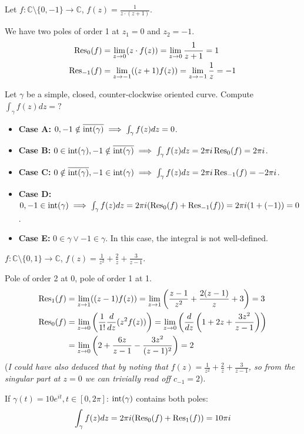 \begin{example}[Example 2]
Let $f: \mathbb{C} \setminus \{0, -1\} \longrightarrow \mathbb{C}$, $f(z) = \frac{1}{z \cdot (z+1)}$.

We have two poles of order 1 at $z_1 = 0$ and $z_2 = -1$.
\begin{align*}
\operatorname{Res}_0(f) &= \lim_{z \to 0} (z \cdot f(z)) = \lim_{z \to 0} \frac{1}{z+1} = 1 \\
\operatorname{Res}_{-1}(f) &= \lim_{z \to -1} ((z+1)f(z)) = \lim_{z \to -1} \frac{1}{z} = -1
\end{align*}

Let $\gamma$ be a simple, closed, counter-clockwise oriented curve. Compute $\int_\gamma f(z) dz = ?$
\begin{itemize}
    \item \textbf{Case A:} $0, -1 \notin \overline{\operatorname{int}(\gamma)} \implies \int_\gamma f(z) dz = 0$.
    \item \textbf{Case B:} $0 \in \operatorname{int}(\gamma), -1 \notin \overline{\operatorname{int}(\gamma)} \implies \int_\gamma f(z) dz = 2\pi i \operatorname{Res}_0(f) = 2\pi i$.
    \item \textbf{Case C:} $0 \notin \overline{\operatorname{int}(\gamma)}, -1 \in \operatorname{int}(\gamma) \implies \int_\gamma f(z) dz = 2\pi i \operatorname{Res}_{-1}(f) = -2\pi i$.
    \item \textbf{Case D:} $0, -1 \in \operatorname{int}(\gamma) \implies \int_\gamma f(z) dz = 2\pi i (\operatorname{Res}_0(f) + \operatorname{Res}_{-1}(f)) = 2\pi i (1 + (-1)) = 0$.
    \item \textbf{Case E:} $0 \in \gamma \lor -1 \in \gamma$. In this case, the integral is not well-defined.
\end{itemize}
\end{example}

\begin{example}[Example 3]
$f: \mathbb{C} \setminus \{0, 1\} \longrightarrow \mathbb{C}$, $f(z) = \frac{1}{z^2} + \frac{2}{z} + \frac{3}{z-1}$.

Pole of order 2 at 0, pole of order 1 at 1.
\begin{align*}
\operatorname{Res}_1(f) &= \lim_{z \to 1} ((z-1)f(z)) = \lim_{z \to 1} \left(\frac{z-1}{z^2} + \frac{2(z-1)}{z} + 3\right) = 3 \\
\operatorname{Res}_0(f) &= \lim_{z \to 0} \left(\frac{1}{1!} \frac{d}{dz}(z^2 f(z))\right) = \lim_{z \to 0} \left(\frac{d}{dz} \left(1 + 2z + \frac{3z^2}{z-1}\right)\right) \\
&= \lim_{z \to 0} \left(2 + \frac{6z}{z-1} - \frac{3z^2}{(z-1)^2}\right) = 2
\end{align*}
(\textit{I could have also deduced that by noting that $f(z) = \frac{1}{z^2} + \frac{2}{z} + \frac{3}{z-1}$, so from the singular part at $z=0$ we can trivially read off $c_{-1} = 2$}).

If $\gamma(t) = 10e^{it}, t \in [0, 2\pi]$:
$\operatorname{int}(\gamma)$ contains both poles:
\[ \int_\gamma f(z) dz = 2\pi i (\operatorname{Res}_0(f) + \operatorname{Res}_1(f)) = 10\pi i \]
\end{example}


